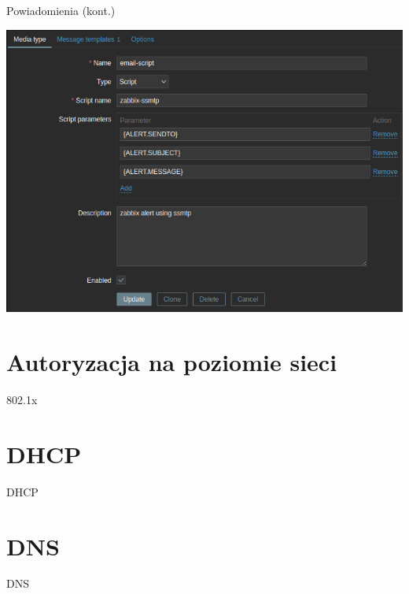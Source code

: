 \documentclass[presentation]{beamer}
\begin{document}
\begin{frame}[label={sec:org8f1ed0c}]{Powiadomienia (kont.)}
\begin{center}
\includegraphics[width=.9\linewidth]{./data/zabbix/trigger.png}
\end{center}
\end{frame}
\section{Autoryzacja na poziomie sieci}
\label{sec:orgc76bf5d}
\begin{frame}[label={sec:orgd83ed7f}]{802.1x}
\end{frame}
\section{DHCP}
\label{sec:org3ce90e4}
\begin{frame}[label={sec:org6a731f5}]{DHCP}
\end{frame}
\section{DNS}
\label{sec:org9221f46}
\begin{frame}[label={sec:org2bda9fb}]{DNS}
\end{frame}
\end{document}
